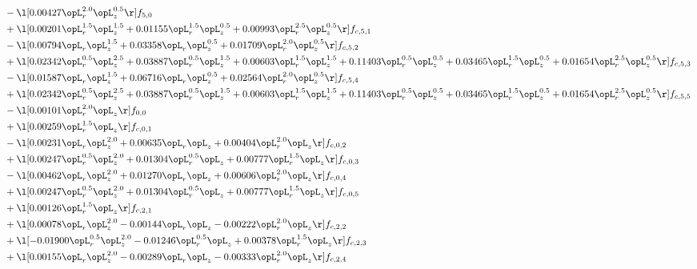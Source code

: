 \begin{alignat}{2}
& - \l[  0.00427 \opL_r^{2.0} \opL_z^{0.5}  \r] f_{5,0} \nonumber \\ 
& + \l[  0.00201 \opL_r^{1.5} \opL_z^{1.5} +  0.01155 \opL_r^{1.5} \opL_z^{0.5} +  0.00993 \opL_r^{2.5} \opL_z^{0.5}  \r] f_{c,5,1} \nonumber \\ 
& - \l[  0.00794 \opL_r \opL_z^{1.5} +  0.03358 \opL_r \opL_z^{0.5} +  0.01709 \opL_r^{2.0} \opL_z^{0.5}  \r] f_{c,5,2} \nonumber \\ 
& + \l[  0.02342 \opL_r^{0.5} \opL_z^{2.5} +  0.03887 \opL_r^{0.5} \opL_z^{1.5} +  0.00603 \opL_r^{1.5} \opL_z^{1.5} +  0.11403 \opL_r^{0.5} \opL_z^{0.5} +  0.03465 \opL_r^{1.5} \opL_z^{0.5} +  0.01654 \opL_r^{2.5} \opL_z^{0.5}  \r] f_{c,5,3} \nonumber \\ 
& - \l[  0.01587 \opL_r \opL_z^{1.5} +  0.06716 \opL_r \opL_z^{0.5} +  0.02564 \opL_r^{2.0} \opL_z^{0.5}  \r] f_{c,5,4} \nonumber \\ 
& + \l[  0.02342 \opL_r^{0.5} \opL_z^{2.5} +  0.03887 \opL_r^{0.5} \opL_z^{1.5} +  0.00603 \opL_r^{1.5} \opL_z^{1.5} +  0.11403 \opL_r^{0.5} \opL_z^{0.5} +  0.03465 \opL_r^{1.5} \opL_z^{0.5} +  0.01654 \opL_r^{2.5} \opL_z^{0.5}  \r] f_{c,5,5} \nonumber \\ 
& - \l[  0.00101 \opL_r^{2.0} \opL_z  \r] f_{0,0} \nonumber \\ 
& + \l[  0.00259 \opL_r^{1.5} \opL_z  \r] f_{c,0,1} \nonumber \\ 
& - \l[  0.00231 \opL_r \opL_z^{2.0} +  0.00635 \opL_r \opL_z +  0.00404 \opL_r^{2.0} \opL_z  \r] f_{c,0,2} \nonumber \\ 
& + \l[  0.00247 \opL_r^{0.5} \opL_z^{2.0} +  0.01304 \opL_r^{0.5} \opL_z +  0.00777 \opL_r^{1.5} \opL_z  \r] f_{c,0,3} \nonumber \\ 
& - \l[  0.00462 \opL_r \opL_z^{2.0} +  0.01270 \opL_r \opL_z +  0.00606 \opL_r^{2.0} \opL_z  \r] f_{c,0,4} \nonumber \\ 
& + \l[  0.00247 \opL_r^{0.5} \opL_z^{2.0} +  0.01304 \opL_r^{0.5} \opL_z +  0.00777 \opL_r^{1.5} \opL_z  \r] f_{c,0,5} \nonumber \\ 
& + \l[  0.00126 \opL_r^{1.5} \opL_z  \r] f_{c,2,1} \nonumber \\ 
& + \l[  0.00078 \opL_r \opL_z^{2.0}   -0.00144 \opL_r \opL_z   -0.00222 \opL_r^{2.0} \opL_z  \r] f_{c,2,2} \nonumber \\ 
& + \l[  -0.01900 \opL_r^{0.5} \opL_z^{2.0}   -0.01246 \opL_r^{0.5} \opL_z +  0.00378 \opL_r^{1.5} \opL_z  \r] f_{c,2,3} \nonumber \\ 
& + \l[  0.00155 \opL_r \opL_z^{2.0}   -0.00289 \opL_r \opL_z   -0.00333 \opL_r^{2.0} \opL_z  \r] f_{c,2,4} \nonumber \\ 

\end{alignat}
